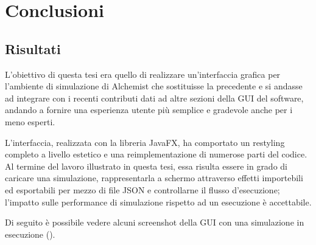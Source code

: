 

\chapter{Conclusioni}\label{ch:conclusioni}
    \section{Risultati}\label{sec:risultati}
        L'obiettivo di questa tesi era quello di realizzare un'interfaccia grafica per l'ambiente di simulazione di Alchemist che sostituisse la precedente e si andasse ad integrare con i recenti contributi dati ad altre sezioni della GUI del software, andando a fornire una esperienza utente più semplice e gradevole anche per i meno esperti.

        L'interfaccia, realizzata con la libreria JavaFX, ha comportato un restyling completo a livello estetico e una reimplementazione di numerose parti del codice.
        Al termine del lavoro illustrato in questa tesi, essa risulta essere in grado di caricare una simulazione, rappresentarla a schermo attraverso effetti importebili ed esportabili per mezzo di file JSON e controllarne il flusso d'esecuzione; l'impatto sulle performance di simulazione rispetto ad un esecuzione  è accettabile.

        Di seguito è possibile vedere alcuni screenshot della GUI con una simulazione in esecuzione ().

